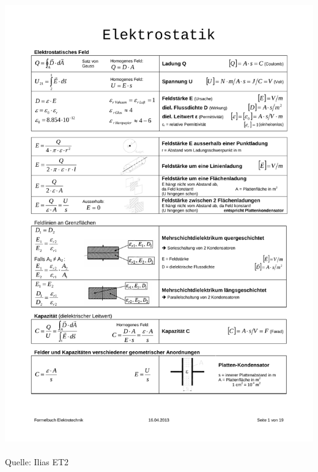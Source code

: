 \includegraphics[page=19,scale=0.57,trim=20mm 20mm 20mm 20mm]{ET-Formelsammlung}
\\
\\
Quelle: Ilias ET2